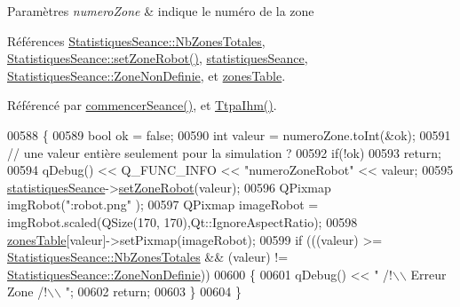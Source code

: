 \begin{DoxyParams}{Paramètres}
{\em numero\+Zone} & indique le numéro de la zone \\
\hline
\end{DoxyParams}


Références \hyperlink{class_statistiques_seance_aa839f5192cbadd7c3fb3651d62eff8b5afe19f73563963b5160847cdd8c2260c4}{Statistiques\+Seance\+::\+Nb\+Zones\+Totales}, \hyperlink{class_statistiques_seance_a97a0cf5b45add60d7a3e31207fe360a0}{Statistiques\+Seance\+::set\+Zone\+Robot()}, \hyperlink{class_ttpa_ihm_abed6897d6f7b4d3a5eb8dcc07651e740}{statistiques\+Seance}, \hyperlink{class_statistiques_seance_aa839f5192cbadd7c3fb3651d62eff8b5afaee4b0051f413cbba9651905daeba28}{Statistiques\+Seance\+::\+Zone\+Non\+Definie}, et \hyperlink{class_ttpa_ihm_af77d75f1aa3eb901b9410e5fc465ece8}{zones\+Table}.



Référencé par \hyperlink{class_ttpa_ihm_a9bf7a4cddbdbf786d781e4d084409068}{commencer\+Seance()}, et \hyperlink{class_ttpa_ihm_ab3ed4b37a93ff04842414d4a98861d66}{Ttpa\+Ihm()}.


\begin{DoxyCode}
00588 \{
00589     \textcolor{keywordtype}{bool} ok = \textcolor{keyword}{false};
00590     \textcolor{keywordtype}{int} valeur = numeroZone.toInt(&ok);
00591     \textcolor{comment}{// une valeur entière seulement pour la simulation ?}
00592     \textcolor{keywordflow}{if}(!ok)
00593         \textcolor{keywordflow}{return};
00594     qDebug() << Q\_FUNC\_INFO << \textcolor{stringliteral}{"numeroZoneRobot"} << valeur;
00595     \hyperlink{class_ttpa_ihm_abed6897d6f7b4d3a5eb8dcc07651e740}{statistiquesSeance}->\hyperlink{class_statistiques_seance_a97a0cf5b45add60d7a3e31207fe360a0}{setZoneRobot}(valeur);
00596     QPixmap imgRobot(\textcolor{stringliteral}{":robot.png"} );
00597     QPixmap imageRobot = imgRobot.scaled(QSize(170, 170),Qt::IgnoreAspectRatio);
00598     \hyperlink{class_ttpa_ihm_af77d75f1aa3eb901b9410e5fc465ece8}{zonesTable}[valeur]->setPixmap(imageRobot);
00599     \textcolor{keywordflow}{if} (((valeur) >= \hyperlink{class_statistiques_seance_aa839f5192cbadd7c3fb3651d62eff8b5afe19f73563963b5160847cdd8c2260c4}{StatistiquesSeance::NbZonesTotales} && (valeur) != 
      \hyperlink{class_statistiques_seance_aa839f5192cbadd7c3fb3651d62eff8b5afaee4b0051f413cbba9651905daeba28}{StatistiquesSeance::ZoneNonDefinie}))
00600     \{
00601         qDebug() << \textcolor{stringliteral}{" /!\(\backslash\)\(\backslash\) Erreur Zone /!\(\backslash\)\(\backslash\) "};
00602         \textcolor{keywordflow}{return};
00603     \}
00604 \}
\end{DoxyCode}


